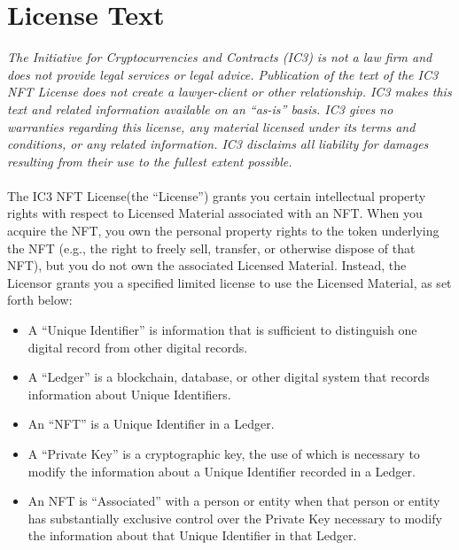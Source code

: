 \documentclass{article}
\newcommand{\iccclicense}{IC3 NFT License\xspace}
\newcommand{\sect}[1]{\vspace{12pt}\noindent{\strong{#1}}}
\newcommand{\subsect}[1]{\vspace{12pt}\noindent{\em{#1}}}
\begin{document}
\section{License Text}
\label{sec:text}

\begin{sffamily} 
 
\emph{The Initiative for Cryptocurrencies and Contracts (IC3) is not a law firm and does not provide legal services or legal advice. Publication of the text of the \iccclicense does not create a lawyer-client or other relationship. IC3 makes this text and related information available on an “as-is” basis. IC3 gives no warranties regarding this license, any material licensed under its terms and conditions, or any related information. IC3 disclaims all liability for damages resulting from their use to the fullest extent possible.}\\\\
The \iccclicense (the ``License'') grants you certain intellectual property rights with respect to Licensed Material associated with an NFT. When you acquire the NFT, you own the personal property rights to the token underlying the NFT (e.g., the right to freely sell, transfer, or otherwise dispose of that  NFT), but you do not own the associated Licensed Material. Instead, the Licensor grants you a specified limited license to use the Licensed Material, as set forth below:

\sect{Definitions}

\subsect{Ledgers and NFTs}


	\begin{itemize}
	\item	A ``Unique Identifier'' is information that is sufficient to distinguish one digital record from other digital records.
		
	\item	A ``Ledger'' is a blockchain, database, or other digital system that records information about Unique Identifiers.
		
	\item	An ``NFT'' is a Unique Identifier in a Ledger.
		
	\item	A ``Private Key'' is a cryptographic key, the use of which is necessary to modify the information about a Unique Identifier recorded in a Ledger.
		
	\item An NFT  is ``Associated'' with a person or entity when that person or entity has substantially exclusive control over the Private Key necessary to modify the information about that Unique Identifier in that Ledger.
		

\end{itemize}
\end{sffamily}
\end{document}
